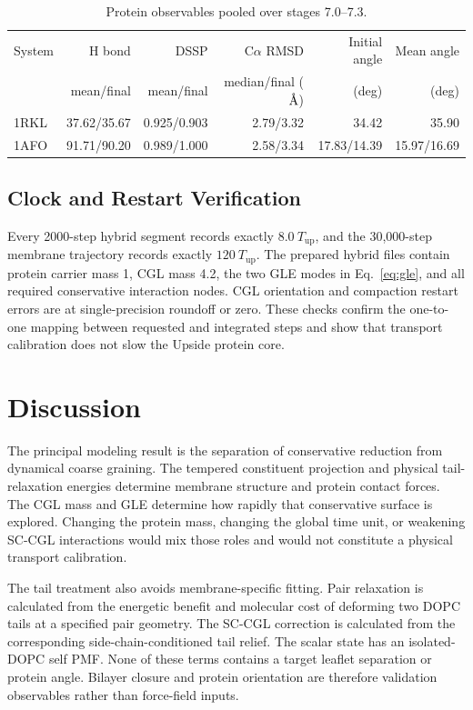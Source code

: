 \documentclass{article}
\newcommand{\angstrom}{\text{\normalfont\AA}}
\begin{document}
\begin{table}[ht]
\centering
\caption{Protein observables pooled over stages 7.0--7.3.}
\small
\begin{tabular}{lrrrrr}
\toprule
System & H bond & DSSP & C$\alpha$ RMSD & Initial angle & Mean angle \\
 & mean/final & mean/final & median/final ($\angstrom$) & (deg) & (deg) \\
\midrule
1RKL & 37.62/35.67 & 0.925/0.903 & 2.79/3.32 & 34.42 & 35.90 \\
1AFO & 91.71/90.20 & 0.989/1.000 & 2.58/3.34 & 17.83/14.39 & 15.97/16.69 \\
\bottomrule
\end{tabular}
\label{tab:protein}
\end{table}

\subsection{Clock and Restart Verification}

Every 2000-step hybrid segment records exactly $8.0~T_{\mathrm{up}}$, and the
30,000-step membrane trajectory records exactly $120~T_{\mathrm{up}}$.  The
prepared hybrid files contain protein carrier mass 1, CGL mass 4.2, the two
GLE modes in Eq.~\ref{eq:gle}, and all required conservative interaction
nodes.  CGL orientation and compaction restart errors are at single-precision
roundoff or zero.  These checks confirm the one-to-one mapping between requested
and integrated steps and show that transport calibration does not slow the
Upside protein core.

\section{Discussion}

The principal modeling result is the separation of conservative reduction from
dynamical coarse graining.  The tempered constituent projection and physical
tail-relaxation energies determine membrane structure and protein contact
forces.  The CGL mass and GLE determine how rapidly that conservative surface
is explored.  Changing the protein mass, changing the global time unit, or
weakening SC-CGL interactions would mix those roles and would not constitute a
physical transport calibration.

The tail treatment also avoids membrane-specific fitting.  Pair relaxation is
calculated from the energetic benefit and molecular cost of deforming two DOPC
tails at a specified pair geometry.  The SC-CGL correction is calculated from
the corresponding side-chain-conditioned tail relief.  The scalar state has an
isolated-DOPC self PMF.  None of these terms contains a target leaflet
separation or protein angle.  Bilayer closure and protein orientation are
therefore validation observables rather than force-field inputs.
\end{document}

